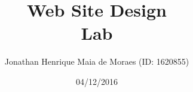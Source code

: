 \title{Web Site Design \\ Lab}
\author{Jonathan Henrique Maia de Moraes (ID: 1620855)}
\date{04/12/2016}
\maketitle
